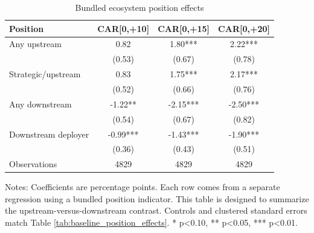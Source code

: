 \begin{table}[!htbp]
\centering
\small
\caption{Bundled ecosystem position effects}
\label{tab:bundle_position_effects}
\begin{tabular}{lccc}
\toprule
Position & CAR[0,+10] & CAR[0,+15] & CAR[0,+20]
\\
\midrule
Any upstream & 0.82 & 1.80*** & 2.22***
\\
 & (0.53) & (0.67) & (0.78)
\\
Strategic/upstream & 0.83 & 1.75*** & 2.17***
\\
 & (0.52) & (0.66) & (0.76)
\\
Any downstream & -1.22** & -2.15*** & -2.50***
\\
 & (0.54) & (0.67) & (0.82)
\\
Downstream deployer & -0.99*** & -1.43*** & -1.90***
\\
 & (0.36) & (0.43) & (0.51)
\\
\midrule
Observations & 4829 & 4829 & 4829
\\
\bottomrule
\end{tabular}
\begin{minipage}{0.94\linewidth}\vspace{0.4em}\footnotesize Notes: Coefficients are percentage points. Each row comes from a separate regression using a bundled position indicator. This table is designed to summarize the upstream-versus-downstream contrast. Controls and clustered standard errors match Table \ref{tab:baseline_position_effects}. * p<0.10, ** p<0.05, *** p<0.01.\end{minipage}
\end{table}
